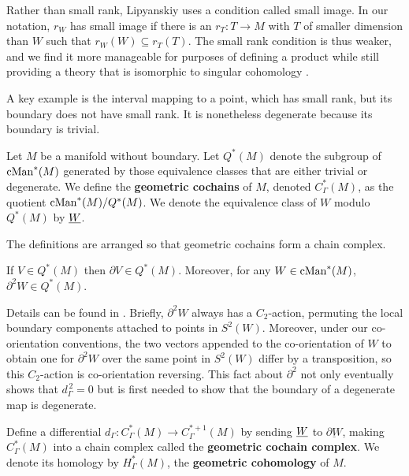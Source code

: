 Rather than small rank, Lipyanskiy uses a condition called small image.
In our notation, $r_W$ has small image if there is an $r_T \colon T \to M$ with $T$ of smaller dimension than $W$ such that $r_W(W) \subseteq r_T(T)$.
The small rank condition is thus weaker, and we find it more manageable for purposes of defining a product while still providing a theory that is isomorphic to singular cohomology \cite{medina2022foundations}.

A key example is the interval mapping to a point, which has small rank, but its boundary does not have small rank.
It is nonetheless degenerate because its boundary is trivial.

\begin{definition}\label{D: geometric cohomology}
	Let $M$ be a manifold without boundary. Let $Q^*(M)$ denote the subgroup
	of $\mathrm{cMan}^*(M)$ generated by those equivalence classes that are either trivial or degenerate.
	We define the \textbf{geometric cochains} of $M$, denoted $C_\Gamma^*(M)$, as the quotient $\mathrm{cMan}^*(M)/ Q^*(M)$.
	We denote the equivalence class of $W$ modulo $Q^*(M)$ by $\underline{W}$.
\end{definition}

The definitions are arranged so that geometric cochains form a chain complex.

\begin{proposition}
	If $V \in Q^*(M)$ then $\partial V \in Q^*(M)$.
	Moreover, for any $W \in \mathrm{cMan}^*(M)$, $\partial^2 W \in Q^*(M)$.
\end{proposition}

Details can be found in \cite{Lipy14, medina2022foundations}.
Briefly, $\partial^2 W$ always has a $C_2$-action, permuting the local boundary components attached to points in $S^2(W)$.
Moreover, under our co-orientation conventions, the two vectors appended to the co-orientation of $W$ to obtain one for $\partial^2 W$ over the same point in $S^2(W)$ differ by a transposition, so this $C_2$-action is co-orientation reversing.
This fact about $\partial^2$ not only eventually shows that $d_\Gamma^{\,2} = 0$ but is first needed to show that the boundary of a degenerate map is degenerate.

\begin{definition}
	Define a differential $d_\Gamma \colon C_\Gamma^*(M) \to C_\Gamma^{*+1}(M)$ by sending $\underline{W}$ to $ \underline{\partial W}$, making $C_\Gamma^*(M)$ into a chain complex called the {\bf geometric cochain complex}.
	We denote its homology by $H^*_\Gamma(M)$, the \textbf{geometric cohomology} of $M$.
\end{definition}

